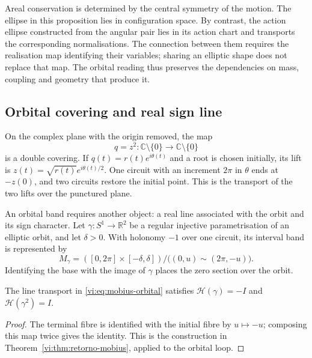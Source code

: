 Areal conservation is determined by the central symmetry
of the motion. The ellipse in this proposition lies in
configuration space. By contrast, the action ellipse constructed
from the angular pair lies in its action chart
and transports the corresponding normalisations. The connection
between them requires the realisation map identifying their
variables; sharing an elliptic shape does not replace that map.
The orbital reading thus preserves the dependencies on mass,
coupling and geometry that produce it.

\subsection{Orbital covering and real sign line}
\label{vi:subsec:cubierta-orbital}

On the complex plane with the origin removed, the map
\begin{equation}
 q=z^2:\mathbb C\setminus\{0\}\longrightarrow
                 \mathbb C\setminus\{0\}
 \label{vi:eq:levi-civita}
\end{equation}
is a double covering. If $q(t)=r(t)e^{i\theta(t)}$ and a
root is chosen initially, its lift is
$z(t)=\sqrt{r(t)}e^{i\theta(t)/2}$. One circuit with an increment
$2\pi$ in $\theta$ ends at $-z(0)$, and two circuits
restore the initial point. This is the transport of the two
lifts over the punctured plane.

An orbital band requires another object: a real line
associated with the orbit and its sign character. Let
$\gamma:S^1\to\mathbb R^2$ be a regular injective
parametrisation of an elliptic orbit, and let $\delta>0$. With
holonomy $-1$ over one circuit, its interval band is
represented by
\begin{equation}
 M_\gamma=([0,2\pi]\times[-\delta,\delta])/
          \bigl((0,u)\sim(2\pi,-u)\bigr).
 \label{vi:eq:mobius-orbital}
\end{equation}
Identifying the base with the image of $\gamma$
places the zero section over the orbit.

\begin{proposition}
\label{vi:prop:holonomia-orbital}
The line transport in \eqref{vi:eq:mobius-orbital}
satisfies
$\mathcal H(\gamma)=-I$ and $\mathcal H(\gamma^2)=I$.
\end{proposition}
\begin{proof}
The terminal fibre is identified with the initial fibre by
$u\mapsto-u$; composing this map twice gives the identity.
This is the construction in
Theorem~\ref{vi:thm:retorno-mobius}, applied to the orbital loop.
\end{proof}

